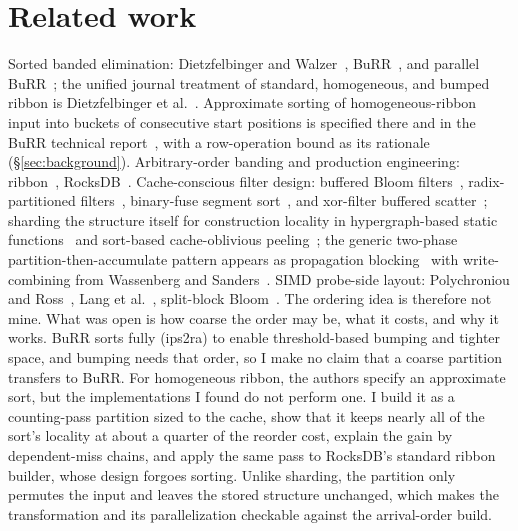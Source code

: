 \documentclass{article}
\begin{document}
\section{Related work}\label{sec:related}
Sorted banded elimination: Dietzfelbinger and Walzer~\citep{dietzfelbinger2019gauss}, BuRR~\citep{dillinger2022burr}, and parallel BuRR~\citep{becht2024parallelburr}; the unified journal treatment of standard, homogeneous, and bumped ribbon is Dietzfelbinger et al.~\citep{dietzfelbinger2026ribbon}. Approximate sorting of homogeneous-ribbon input into buckets of consecutive start positions is specified there and in the BuRR technical report~\citep{dillinger2021burrtr}, with a row-operation bound as its rationale (\S\ref{sec:background}). Arbitrary-order banding and production engineering: ribbon~\citep{dillinger2021ribbon}, RocksDB~\citep{rocksdbribbonblog}. Cache-conscious filter design: buffered Bloom filters~\citep{canim2010buffered}, radix-partitioned filters~\citep{schmidt2021partitioned}, binary-fuse segment sort~\citep{graf2022binaryfuse}, and xor-filter buffered scatter~\citep{graf2020xor}; sharding the structure itself for construction locality in hypergraph-based static functions~\citep{genuzio2016fast,vigna2025sharding} and sort-based cache-oblivious peeling~\citep{belazzougui2013peeling}; the generic two-phase partition-then-accumulate pattern appears as propagation blocking~\citep{beamer2017propagation} with write-combining from Wassenberg and Sanders~\citep{wassenberg2011radix}. SIMD probe-side layout: Polychroniou and Ross~\citep{polychroniou2014vectorized}, Lang et al.~\citep{lang2019performance}, split-block Bloom~\citep{apache2021sbbf}. The ordering idea is therefore not mine. What was open is how coarse the order may be, what it costs, and why it works. BuRR sorts fully (ips2ra) to enable threshold-based bumping and tighter space, and bumping needs that order, so I make no claim that a coarse partition transfers to BuRR. For homogeneous ribbon, the authors specify an approximate sort, but the implementations I found do not perform one. I build it as a counting-pass partition sized to the cache, show that it keeps nearly all of the sort's locality at about a quarter of the reorder cost, explain the gain by dependent-miss chains, and apply the same pass to RocksDB's standard ribbon builder, whose design forgoes sorting. Unlike sharding, the partition only permutes the input and leaves the stored structure unchanged, which makes the transformation and its parallelization checkable against the arrival-order build.
\end{document}
